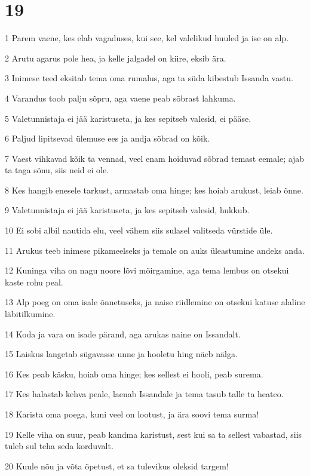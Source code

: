 \chapter{19}

\par 1 Parem vaene, kes elab vagaduses, kui see, kel valelikud huuled ja ise on alp.
\par 2 Arutu agarus pole hea, ja kelle jalgadel on kiire, eksib ära.
\par 3 Inimese teed eksitab tema oma rumalus, aga ta süda kibestub Issanda vastu.
\par 4 Varandus toob palju sõpru, aga vaene peab sõbrast lahkuma.
\par 5 Valetunnistaja ei jää karistuseta, ja kes sepitseb valesid, ei pääse.
\par 6 Paljud lipitsevad ülemuse ees ja andja sõbrad on kõik.
\par 7 Vaest vihkavad kõik ta vennad, veel enam hoiduvad sõbrad temast eemale; ajab ta taga sõnu, siis neid ei ole.
\par 8 Kes hangib enesele tarkust, armastab oma hinge; kes hoiab arukust, leiab õnne.
\par 9 Valetunnistaja ei jää karistuseta, ja kes sepitseb valesid, hukkub.
\par 10 Ei sobi albil nautida elu, veel vähem siis sulasel valitseda vürstide üle.
\par 11 Arukus teeb inimese pikameelseks ja temale on auks üleastumine andeks anda.
\par 12 Kuninga viha on nagu noore lõvi möirgamine, aga tema lembus on otsekui kaste rohu peal.
\par 13 Alp poeg on oma isale õnnetuseks, ja naise riidlemine on otsekui katuse alaline läbitilkumine.
\par 14 Koda ja vara on isade pärand, aga arukas naine on Issandalt.
\par 15 Laiskus langetab sügavasse unne ja hooletu hing näeb nälga.
\par 16 Kes peab käsku, hoiab oma hinge; kes sellest ei hooli, peab surema.
\par 17 Kes halastab kehva peale, laenab Issandale ja tema tasub talle ta heateo.
\par 18 Karista oma poega, kuni veel on lootust, ja ära soovi tema surma!
\par 19 Kelle viha on suur, peab kandma karistust, sest kui sa ta sellest vabastad, siis tuleb sul teha seda korduvalt.
\par 20 Kuule nõu ja võta õpetust, et sa tulevikus oleksid targem!
